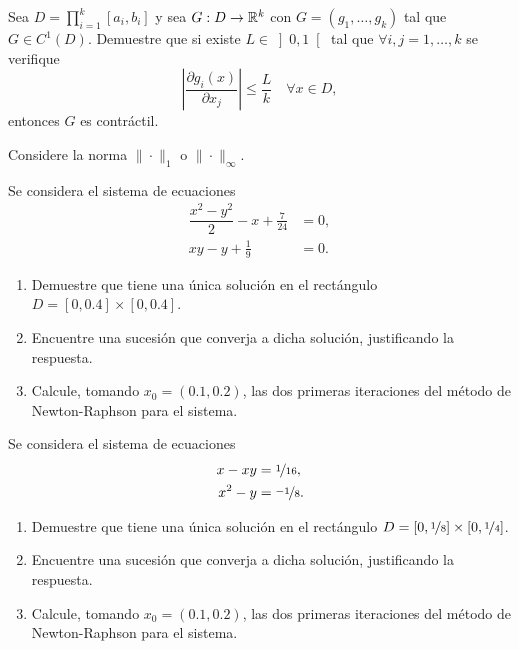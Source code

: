 \begin{ejercicio}\label{ej:1.1.16}
    Sea $D = \prod\limits_{i=1}^k[a_i, b_i]$ y sea $G : D \to \mathbb{R}^k$ con $G = (g_1, \ldots, g_k)$ tal que $G \in C^1(D)$. Demuestre que si existe $L \in\left]0, 1\right[$ tal que $\forall i, j = 1, \ldots, k$ se verifique
    \begin{equation*}
        \left\lvert \dfrac{\partial g_i(x)}{\partial x_j} \right\rvert \leq \dfrac{L}{k}\quad \forall x \in D,
    \end{equation*}
    entonces $G$ es contráctil.
    \begin{observacion}
        Considere la norma $\| \cdot \|_1$ o $\| \cdot \|_\infty$.
    \end{observacion}
\end{ejercicio}

\begin{ejercicio}\label{ej:1.1.17}
    Se considera el sistema de ecuaciones
    \begin{align*}
        \dfrac{x^2-y^2}{2}-x + \frac{7}{24} &= 0, \\
        xy - y + \frac{1}{9} &= 0.
    \end{align*}
    \begin{enumerate}
        \item Demuestre que tiene una única solución en el rectángulo $D = [0, 0.4] \times [0, 0.4]$.
        \item Encuentre una sucesión que converja a dicha solución, justificando la respuesta.
        \item Calcule, tomando $x_0 = (0.1, 0.2)$, las dos primeras iteraciones del método de Newton-Raphson para el sistema.
    \end{enumerate}
\end{ejercicio}


\begin{ejercicio}\label{ej:1.1.18}
    Se considera el sistema de ecuaciones
    \begin{align*}
        x - xy &= \nicefrac{1}{16}, \\
        x^2 - y &= \nicefrac{-1}{8}.
    \end{align*}
    \begin{enumerate}
        \item Demuestre que tiene una única solución en el rectángulo $D = [0, \nicefrac{1}{8}] \times [0, \nicefrac{1}{4}]$.
        \item Encuentre una sucesión que converja a dicha solución, justificando la respuesta.
        \item Calcule, tomando $x_0 = (0.1, 0.2)$, las dos primeras iteraciones del método de Newton-Raphson para el sistema.
    \end{enumerate}
\end{ejercicio}